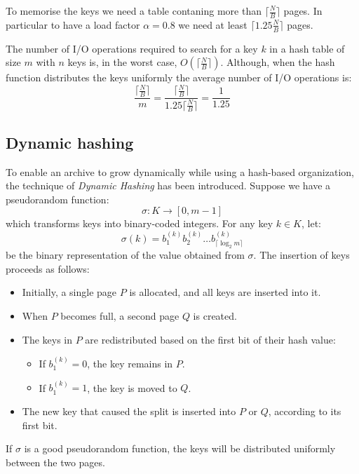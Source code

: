 \documentclass{report}
\begin{document}
To memorise the keys we need a table contaning more than \(\lceil \frac{N}{B} \rceil\) pages. In particular to have a load factor \(\alpha = 0.8\) we need at least \(\lceil 1.25 \frac{N}{B} \rceil\) pages.

The number of I/O operations required to search for a key \(k\) in a hash table of size \(m\) with \(n\) keys is, in the worst case, \(O(\lceil \frac{N}{B} \rceil)\). Although, when the hash function distributes the keys uniformly the average number of I/O operations is:
\begin{equation}
    \frac{\lceil \frac{N}{B} \rceil}{m} = \frac{\lceil \frac{N}{B} \rceil}{1.25 \lceil \frac{N}{B} \rceil} = \frac{1}{1.25}
\end{equation}
\subsection{Dynamic hashing}
To enable an archive to grow dynamically while using a hash-based organization, the technique of \textit{Dynamic Hashing} has been introduced. Suppose we have a pseudorandom function:
\begin{equation}
    \sigma : K \to [0, m - 1]
\end{equation}
which transforms keys into binary-coded integers. For any key \( k \in K \), let:
\begin{equation}   
    \sigma(k) = b^{(k)}_1 b^{(k)}_2 \ldots b^{(k)}_{\lceil \log_2 m \rceil}
\end{equation}
be the binary representation of the value obtained from \( \sigma \). The insertion of keys proceeds as follows:
\begin{itemize}
    \item Initially, a single page \( P \) is allocated, and all keys are inserted into it.
    \item When \( P \) becomes full, a second page \( Q \) is created.
    \item The keys in \( P \) are redistributed based on the first bit of their hash value:
    \begin{itemize}
        \item If \( b^{(k)}_1 = 0 \), the key remains in \( P \).
        \item If \( b^{(k)}_1 = 1 \), the key is moved to \( Q \).
    \end{itemize}
    \item The new key that caused the split is inserted into \( P \) or \( Q \), according to its first bit.
\end{itemize}
\noindent
If \( \sigma \) is a good pseudorandom function, the keys will be distributed uniformly between the two pages.
\end{document}
